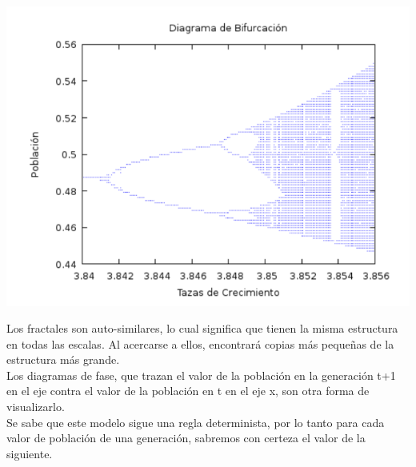 \documentclass{article}
\begin{document}
\begin{center}
\includegraphics[scale=0.6]{Act105.PNG}
\end{center}

Los fractales son auto-similares, lo cual significa que tienen la misma estructura en todas las escalas. Al acercarse a ellos, encontrará copias más pequeñas de la estructura más grande. \\ 
Los diagramas de fase, que trazan el valor de la población en la generación t+1 en el eje contra el valor de la población en t en el eje x, son otra forma de visualizarlo.\\
Se sabe que este modelo sigue una regla determinista, por lo tanto para cada valor de población de una generación, sabremos con certeza el valor de la siguiente.
\end{document}
